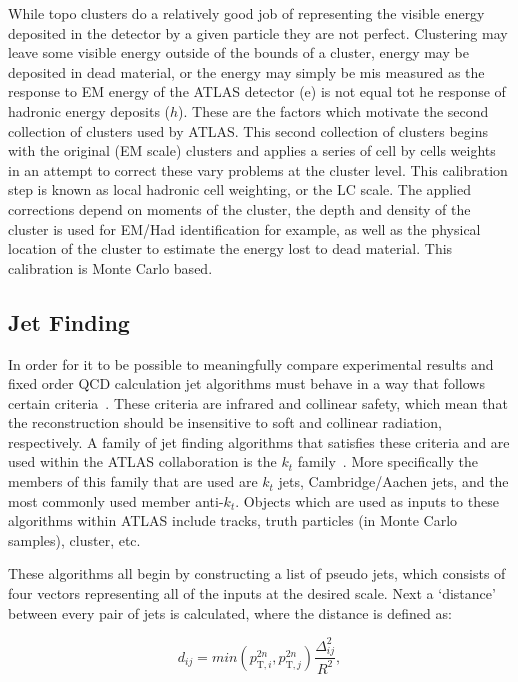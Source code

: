 While topo clusters do a relatively good job of representing the visible energy deposited in the detector by a given particle they are not perfect.  
Clustering may leave some visible energy outside of the bounds of a cluster, energy may be deposited in dead material, or the energy may simply be mis measured as the response to EM energy of the ATLAS detector (e) is not equal tot he response of hadronic energy deposits ($h$).  
These are the factors which motivate the second collection of clusters used by ATLAS.  
This second collection of clusters begins with the original (EM scale) clusters and applies a series of cell by cells weights in an attempt to correct these vary problems at the cluster level.  
This calibration step is known as local hadronic cell weighting, or the LC scale.  
The applied corrections depend on moments of the cluster, the depth and density of the cluster is used for EM/Had identification for example, as well as the physical location of the cluster to estimate the energy lost to dead material.  
This calibration is Monte Carlo based.  

\subsection{Jet Finding}

In order for it to be possible to meaningfully compare experimental results and fixed order QCD calculation jet algorithms must behave in a way that follows certain criteria~\cite{Blazey:2000qt}.  
These criteria are infrared and collinear safety, which mean that the reconstruction should be insensitive to soft and collinear radiation, respectively.  
A family of jet finding algorithms that satisfies these criteria and are used within the ATLAS collaboration is the $k_t$ family~\cite{Cacciari:2008gp}.  
More specifically the members of this family that are used are $k_t$ jets, Cambridge/Aachen jets, and the most commonly used member anti-$k_t$.  
Objects which are used as inputs to these algorithms within ATLAS include tracks, truth particles (in Monte Carlo samples), cluster, etc.  

These algorithms all begin by constructing a list of pseudo jets, which consists of four vectors representing all of the inputs at the desired scale.  
Next a `distance' between every pair of jets is calculated, where the distance is defined as:

\begin{equation}
  d_{ij}=min\left(p_{\mathrm T,i}^{2n}, p_{\mathrm T,j}^{2n}\right)\frac{\Delta_{ij}^2}{R^2}, 
\end{equation}

